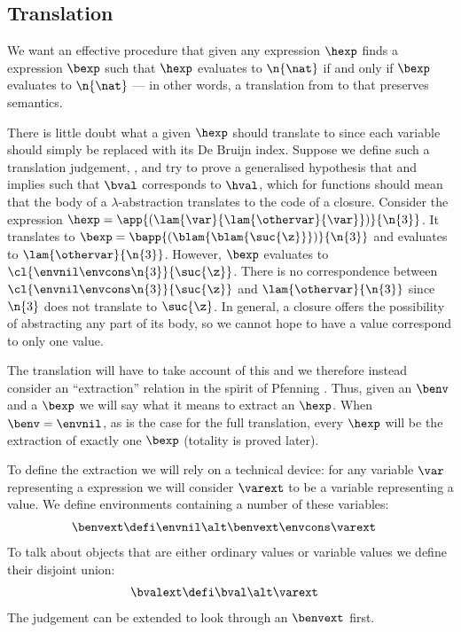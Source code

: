 \subsection{Translation}
We want an effective procedure that given any \hlang expression $\hexp$ finds a \blang expression $\bexp$ such that $\hexp$ evaluates to $\n{\nat}$ if and only if $\bexp$ evaluates to $\n{\nat}$ --- in other words, a translation from \hlang to \blang that preserves semantics.

There is little doubt what a given $\hexp$ should translate to since each variable should simply be replaced with its De Bruijn index.
Suppose we define such a translation judgement, \trahbfaux{\hexp}{\bexp}, and try to prove a generalised hypothesis that \trahbfaux{\hexp}{\bexp} and \hev{\hexp}{\hval} implies \bev{\benv}{\bexp}{\bval} such that $\bval$ corresponds to $\hval$, which for functions should mean that the body of a \hlang $\lambda$-abstraction translates to the code of a \blang closure.
Consider the expression $\hexp = \app{(\lam{\var}{\lam{\othervar}{\var}})}{\n{3}}$.
It translates to $\bexp = \bapp{(\blam{\blam{\suc{\z}}})}{\n{3}}$ and evaluates to $\lam{\othervar}{\n{3}}$.
However, $\bexp$ evaluates to $\cl{\envnil \envcons \n{3}}{\suc{\z}}$.
There is no correspondence between $\cl{\envnil \envcons \n{3}}{\suc{\z}}$ and $\lam{\othervar}{\n{3}}$ since $\n{3}$ does not translate to $\suc{\z}$.
In general, a closure offers the possibility of abstracting any part of its body, so we cannot hope to have a \hlang value correspond to only one \blang value.

The translation will have to take account of this and we therefore instead consider an ``extraction'' relation in the spirit of Pfenning \cite[p. 150]{Pfenning01}.
Thus, given an $\benv$ and a $\bexp$ we will say what it means to extract an $\hexp$.
When $\benv = \envnil$, as is the case for the full translation, every $\hexp$ will be the extraction of exactly one $\bexp$ (totality is proved later).

To define the extraction we will rely on a technical device: for any variable $\var$ representing a \hlang expression we will consider $\varext$ to be a variable representing a \blang value.
We define environments containing a number of these variables:
\begin{align*}
  \benvext &\defi \envnil \alt \benvext \envcons \varext
\end{align*}
To talk about objects that are either ordinary values or variable values we define their disjoint union:
\begin{align*}
  \bvalext &\defi \bval \alt \varext
\end{align*}
The \blook{\benv}{\bvar}{\bval} judgement can be extended to look through an $\benvext$ first.


